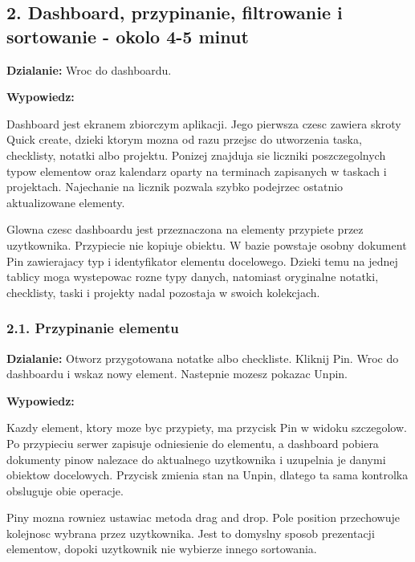 \documentclass[
  polish,
  12pt,
  a4paper,
]{article}
\renewenvironment{quote}
  {\list{}{\leftmargin=1.2em\rightmargin=0.6em}%
   \item\relax\color{black}\setlength{\parskip}{0.7em}}
  {\endlist}
\begin{document}
\subsection{2. Dashboard, przypinanie, filtrowanie i sortowanie - okolo
4-5
minut}\label{2-dashboard-przypinanie-filtrowanie-i-sortowanie---okolo-4-5-minut}

\textbf{Dzialanie:} Wroc do dashboardu.

\textbf{Wypowiedz:}

\begin{quote}
Dashboard jest ekranem zbiorczym aplikacji. Jego pierwsza czesc zawiera
skroty Quick create, dzieki ktorym mozna od razu przejsc do utworzenia
taska, checklisty, notatki albo projektu. Ponizej znajduja sie liczniki
poszczegolnych typow elementow oraz kalendarz oparty na terminach
zapisanych w taskach i projektach. Najechanie na licznik pozwala szybko
podejrzec ostatnio aktualizowane elementy.

Glowna czesc dashboardu jest przeznaczona na elementy przypiete przez
uzytkownika. Przypiecie nie kopiuje obiektu. W bazie powstaje osobny
dokument Pin zawierajacy typ i identyfikator elementu docelowego. Dzieki
temu na jednej tablicy moga wystepowac rozne typy danych, natomiast
oryginalne notatki, checklisty, taski i projekty nadal pozostaja w
swoich kolekcjach.
\end{quote}

\subsubsection{2.1. Przypinanie elementu}\label{21-przypinanie-elementu}

\textbf{Dzialanie:} Otworz przygotowana notatke albo checkliste. Kliknij
Pin. Wroc do dashboardu i wskaz nowy element. Nastepnie mozesz pokazac
Unpin.

\textbf{Wypowiedz:}

\begin{quote}
Kazdy element, ktory moze byc przypiety, ma przycisk Pin w widoku
szczegolow. Po przypieciu serwer zapisuje odniesienie do elementu, a
dashboard pobiera dokumenty pinow nalezace do aktualnego uzytkownika i
uzupelnia je danymi obiektow docelowych. Przycisk zmienia stan na Unpin,
dlatego ta sama kontrolka obsluguje obie operacje.

Piny mozna rowniez ustawiac metoda drag and drop. Pole position
przechowuje kolejnosc wybrana przez uzytkownika. Jest to domyslny sposob
prezentacji elementow, dopoki uzytkownik nie wybierze innego sortowania.
\end{quote}
\end{document}
